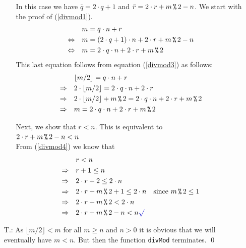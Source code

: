 \begin{enumerate}
\begin{enumerate}
    In this case we have $\bar{q} = 2 \cdot q + 1$ and $\bar{r} = 2 \cdot r + m \mmod 2 - n$.
    We start with the proof of (\ref{divmod1}).
    \begin{align*}
                           & m = \bar{q} \cdot n + \bar{r} \\
      \Leftrightarrow\quad & m = (2 \cdot q + 1) \cdot n + 2 \cdot r + m \mmod 2 - n \\
      \Leftrightarrow\quad & m = 2 \cdot q \cdot n + 2 \cdot r + m \mmod 2 
    \end{align*}
    This last equation follows from equation (\ref{divmod3}) as follows:
    \begin{align*}
                       & \lfloor m / 2 \rfloor = q \cdot n + r \\
      \Rightarrow\quad & 2 \cdot \lfloor m / 2 \rfloor = 2 \cdot q \cdot n + 2 \cdot r \\
      \Rightarrow\quad & 2 \cdot \lfloor m / 2 \rfloor + m \mmod 2 = 2 \cdot q \cdot n + 2 \cdot r + m \mmod 2 \\
      \Rightarrow\quad & m = 2 \cdot q \cdot n + 2 \cdot r + m \mmod 2 
    \end{align*}

    Next, we show that $\bar{r} < n$. This is equivalent to
    \\[0.2cm]
    \hspace*{1.3cm}
    $2 \cdot r + m \mmod 2 - n < n$
    \\[0.2cm]
    From (\ref{divmod4}) we know that
    \begin{align*}
                       & r < n \\
      \Rightarrow\quad & r + 1 \leq n \\
      \Rightarrow\quad & 2 \cdot r + 2 \leq 2 \cdot n \\
      \Rightarrow\quad & 2 \cdot r + m \mmod 2 + 1 \leq 2 \cdot n \quad \mbox{since $m \mmod 2 \leq 1$} \\
      \Rightarrow\quad & 2 \cdot r + m \mmod 2 < 2 \cdot n \\
      \Rightarrow\quad & 2 \cdot r + m \mmod 2 - n < n \green{\surd}
    \end{align*}
  \end{enumerate}
\item[T.:] As $\lfloor m / 2 \rfloor < m$ for all $m \geq n$ and $n > 0$ it is obvious that we will eventually have
  $m  < n$. But then the function \texttt{divMod} terminates. \qed
\end{enumerate}

